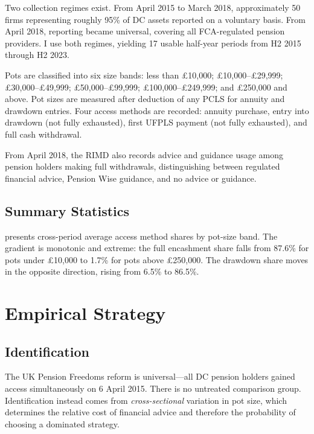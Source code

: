 \documentclass[12pt]{article}
\begin{document}
Two collection regimes exist. From April 2015 to March 2018, approximately 50 firms representing roughly 95\% of DC assets reported on a voluntary basis. From April 2018, reporting became universal, covering all FCA-regulated pension providers. I use both regimes, yielding 17 usable half-year periods from H2 2015 through H2 2023.

Pots are classified into six size bands: less than \pounds10,000; \pounds10,000--\pounds29,999; \pounds30,000--\pounds49,999; \pounds50,000--\pounds99,999; \pounds100,000--\pounds249,999; and \pounds250,000 and above. Pot sizes are measured after deduction of any PCLS for annuity and drawdown entries. Four access methods are recorded: annuity purchase, entry into drawdown (not fully exhausted), first UFPLS payment (not fully exhausted), and full cash withdrawal.

From April 2018, the RIMD also records advice and guidance usage among pension holders making full withdrawals, distinguishing between regulated financial advice, Pension Wise guidance, and no advice or guidance.

\subsection{Summary Statistics}

 presents cross-period average access method shares by pot-size band. The gradient is monotonic and extreme: the full encashment share falls from 87.6\% for pots under \pounds10,000 to 1.7\% for pots above \pounds250,000. The drawdown share moves in the opposite direction, rising from 6.5\% to 86.5\%.



\section{Empirical Strategy}

\subsection{Identification}

The UK Pension Freedoms reform is universal---all DC pension holders gained access simultaneously on 6 April 2015. There is no untreated comparison group. Identification instead comes from \textit{cross-sectional} variation in pot size, which determines the relative cost of financial advice and therefore the probability of choosing a dominated strategy.
\end{document}
